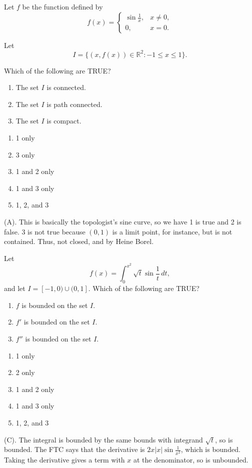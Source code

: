\begin{exercise}
Let $f$ be the function defined by
\[
f(x)=
\begin{cases}
\sin\frac{1}{x}, & x\neq 0,\\
0, & x=0.
\end{cases}
\]

Let
\[
I=\{(x,f(x))\in\mathbb{R}^2:-1\leq x\leq 1\}.
\]

Which of the following are TRUE?

\begin{enumerate}
    \item The set $I$ is connected.
    \item The set $I$ is path connected.
    \item The set $I$ is compact.
\end{enumerate}

\begin{enumerate}[label=(\Alph*)]
    \item 1 only
    \item 3 only
    \item 1 and 2 only
    \item 1 and 3 only
    \item 1, 2, and 3
\end{enumerate}
\end{exercise}
\begin{solution}
(A). This is basically the topologist's sine curve, so we have 1 is true and 2 is false. 
3 is not true because $(0,1)$ is a limit point, for instance, but is not contained. Thus, not 
closed, and by Heine Borel.
\end{solution}

\begin{exercise}
Let
\[
f(x)=\int_0^{x^2}\sqrt{t}\sin\frac{1}{t}\,dt,
\]
and let $I=[-1,0)\cup(0,1]$. Which of the following are TRUE?
\begin{enumerate}
    \item $f$ is bounded on the set $I$.
    \item $f'$ is bounded on the set $I$.
    \item $f''$ is bounded on the set $I$.
\end{enumerate}
\begin{enumerate}[label=(\Alph*)]
    \item 1 only
    \item 2 only
    \item 1 and 2 only
    \item 1 and 3 only
    \item 1, 2, and 3
\end{enumerate}
\end{exercise}
\begin{solution}
(C). The integral is bounded by the same bounds with integrand $\sqrt{t}$, so is bounded.
The FTC says that the derivative is $2x|x| \sin \frac{1}{x^2}$, which is bounded.
Taking the derivative gives a term with $x$ at the denominator, so is unbounded.
\end{solution}

